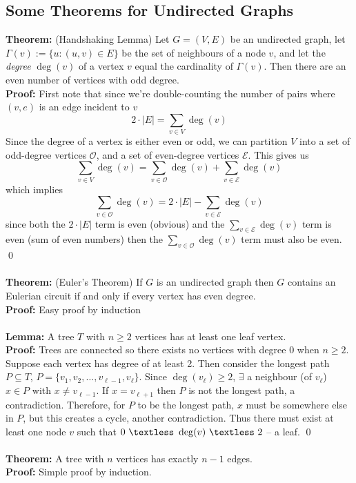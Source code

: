 \documentclass{article}
\newcommand{\ti}[1]{\textit{#1}}
\newcommand{\lt}{\textless}
\newcommand{\x}{\cdot}
\newcommand{\Ga}{\Gamma}
\newcommand{\thm}{\textbf{Theorem: }}
\newcommand{\lem}{\textbf{Lemma: }}
\newcommand{\proo}{\textbf{Proof: }}
\begin{document}
\subsection{Some Theorems for Undirected Graphs}
\thm (Handshaking Lemma) Let $G = (V, E)$ be an undirected graph, let $\Ga(v) := \{u : (u, v) \in E\}$ be the set of neighbours of a node $v$, and let the \ti{degree} $\deg(v)$ of a vertex $v$ equal the cardinality of $\Ga(v)$. Then there are an even number of vertices with odd degree.\\
\proo First note that since we're double-counting the number of pairs where $(v, e)$ is an edge incident to $v$
\[2 \x |E| = \sum_{v \in V} \deg(v) \]
Since the degree of a vertex is either even or odd, we can partition $V$ into a set of odd-degree vertices $\mathcal{O}$, and a set of even-degree vertices $\mathcal{E}$. This gives us
\[\sum_{v \in V} \deg(v) = \sum_{v \in \mathcal{O}} \deg(v) + \sum_{v \in \mathcal{E}} \deg(v)\]
which implies
\[\sum_{v \in \mathcal{O}} \deg(v) = 2\x |E| - \sum_{v \in \mathcal{E}} \deg(v)\]
since both the $2\x |E|$ term is even (obvious) and the $\displaystyle \sum_{v \in \mathcal{E}} \deg(v)$ term is even (sum of even numbers) then the $\displaystyle \sum_{v \in \mathcal{O}} \deg(v)$ term must also be even.
\qed\\\\
\thm (Euler's Theorem) If $G$ is an undirected graph then $G$ contains an Eulerian circuit if and only if every vertex has even degree.\\
\proo Easy proof by induction\\\\
\lem A tree $T$ with $n \geq 2$ vertices has at least one leaf vertex.\\
\proo Trees are connected so there exists no vertices with degree 0 when $n \geq 2$. Suppose each vertex has degree of at least 2. Then consider the longest path $P \subseteq T$, $P = \{v_1, v_2, \dots, v_{\ell-1}, v_{\ell}\}$. Since $\deg(v_{\ell}) \geq 2$, $\exists$ a neighbour (of $v_{\ell}$) $x \in P$ with $x \neq v_{\ell-1}$. If $x = v_{\ell + 1}$ then $P$ is not the longest path, a contradiction. Therefore, for $P$ to be the longest path, $x$ must be somewhere else in $P$, but this creates a cycle, another contradiction. Thus there must exist at least one node $v$ such that $0\ \lt\ \deg(v)\ \lt\ 2$ -- a leaf.
\qed\\\\
\thm A tree with $n$ vertices has exactly $n-1$ edges.\\
\proo Simple proof by induction.\\
\end{document}
